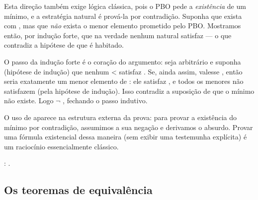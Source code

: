     Esta direção também exige lógica clássica, pois o PBO pede a
    \textit{existência} de um mínimo, e a estratégia natural é prová-la por
    contradição. Suponha que exista  com  , mas que \textit{não}
    exista o menor elemento prometido pelo PBO. Mostramos então, por
    indução forte, que na verdade nenhum natural satisfaz  — o
    que contradiz a hipótese de que  é habitado.


    O passo da indução forte é o coração do argumento: seja 
    arbitrário e suponha (hipótese de indução) que nenhum  < 
    satisfaz . Se, ainda assim, valesse  , então  seria
    exatamente um menor elemento de : ele satisfaz , e todos os
    menores não satisfazem (pela hipótese de indução). Isso contradiz
    a suposição de que o mínimo não existe. Logo \ensuremath{\lnot}  , fechando o
    passo indutivo.


    O uso de  aparece na estrutura externa da prova: para
    provar a existência do mínimo por contradição, assumimos a sua
    negação e derivamos o absurdo. Provar uma fórmula existencial
    dessa maneira (sem exibir uma testemunha explícita) é um
    raciocínio essencialmente clássico. 
\begin{coqdoccode}
\coqdocemptyline
\coqdocnoindent
{} :   .\coqdoceol
\coqdocemptyline
\end{coqdoccode}
\subsection{Os teoremas de equivalência}




